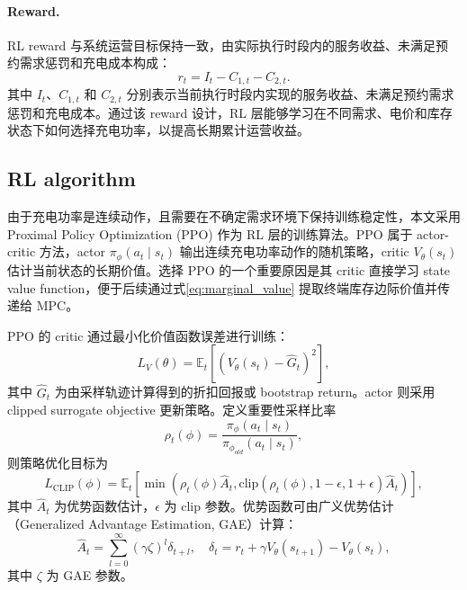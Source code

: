 \documentclass[12pt,hyperref,a4paper,UTF8]{ctexart}
\begin{document}
\paragraph{Reward.}
RL reward 与系统运营目标保持一致，由实际执行时段内的服务收益、未满足预约需求惩罚和充电成本构成：
\begin{equation}
r_t=I_t-C_{1,t}-C_{2,t}.
\label{eq:rl_reward}
\end{equation}
其中 $I_t$、$C_{1,t}$ 和 $C_{2,t}$ 分别表示当前执行时段内实现的服务收益、未满足预约需求惩罚和充电成本。通过该 reward 设计，RL 层能够学习在不同需求、电价和库存状态下如何选择充电功率，以提高长期累计运营收益。

\subsection{RL algorithm}

由于充电功率是连续动作，且需要在不确定需求环境下保持训练稳定性，本文采用 Proximal Policy Optimization (PPO) 作为 RL 层的训练算法。PPO 属于 actor-critic 方法，actor $\pi_{\phi}(a_t\mid s_t)$ 输出连续充电功率动作的随机策略，critic $V_{\theta}(s_t)$ 估计当前状态的长期价值。选择 PPO 的一个重要原因是其 critic 直接学习 state value function，便于后续通过式\eqref{eq:marginal_value} 提取终端库存边际价值并传递给 MPC。

PPO 的 critic 通过最小化价值函数误差进行训练：
\begin{equation}
L_V(\theta)=
\mathbb{E}_t\left[
\left(V_{\theta}(s_t)-\hat{G}_t\right)^2
\right],
\label{eq:value_loss}
\end{equation}
其中 $\hat{G}_t$ 为由采样轨迹计算得到的折扣回报或 bootstrap return。actor 则采用 clipped surrogate objective 更新策略。定义重要性采样比率
\begin{equation}
\rho_t(\phi)=
\frac{\pi_{\phi}(a_t\mid s_t)}{\pi_{\phi_{old}}(a_t\mid s_t)},
\label{eq:ppo_ratio}
\end{equation}
则策略优化目标为
\begin{equation}
L_{\mathrm{CLIP}}(\phi)=
\mathbb{E}_t\left[
\min\left(
\rho_t(\phi)\hat{A}_t,
\mathrm{clip}(\rho_t(\phi),1-\epsilon,1+\epsilon)\hat{A}_t
\right)
\right],
\label{eq:ppo_clip}
\end{equation}
其中 $\hat{A}_t$ 为优势函数估计，$\epsilon$ 为 clip 参数。优势函数可由广义优势估计（Generalized Advantage Estimation, GAE）计算：
\begin{equation}
\hat{A}_t=\sum_{l=0}^{\infty}(\gamma\zeta)^l\delta_{t+l},
\quad
\delta_t=r_t+\gamma V_{\theta}(s_{t+1})-V_{\theta}(s_t),
\label{eq:gae}
\end{equation}
其中 $\zeta$ 为 GAE 参数。
\end{document}
